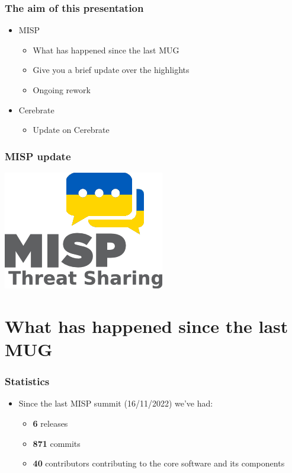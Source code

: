 
\begin{frame}
\titlepage
\end{frame}

\begin{frame}
  \frametitle{The aim of this presentation}
  \begin{itemize}
    \item MISP
    \begin{itemize}
     \item What has happened since the last MUG
     \item Give you a brief update over the highlights
     \item Ongoing rework
    \end{itemize}
    \item Cerebrate
    \begin{itemize}
     \item Update on Cerebrate
    \end{itemize}
  \end{itemize}
\end{frame}

\begin{frame}
\frametitle{MISP update}
\begin{center}
\includegraphics[scale=0.3]{images/misp.png}
\end{center}
\end{frame}

\section{What has happened since the last MUG}

\begin{frame}
  \frametitle{Statistics}
  \begin{itemize}
    \item Since the last MISP summit (16/11/2022) we've had:
    \begin{itemize}
        \item {\bf 6} releases
        \item {\bf 871} commits
        \item {\bf 40} contributors contributing to the core software and its components
    \end{itemize}
  \end{itemize}
\end{frame}

